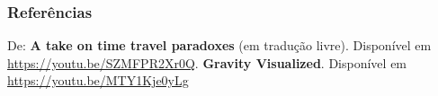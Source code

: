 \documentclass[brazil]{beamer}
\begin{document}
    \begin{frame}[allowframebreaks]
        \frametitle{Referências}

        \begin{thebibliography}{99}
             De: {\bfseries A take on time travel paradoxes} (em tradução livre). Disponível em \url{https://youtu.be/SZMFPR2Xr0Q}.
             {\bf Gravity Visualized}. Disponível em \url{https://youtu.be/MTY1Kje0yLg}
        \end{thebibliography}
    \end{frame}
\end{document}
